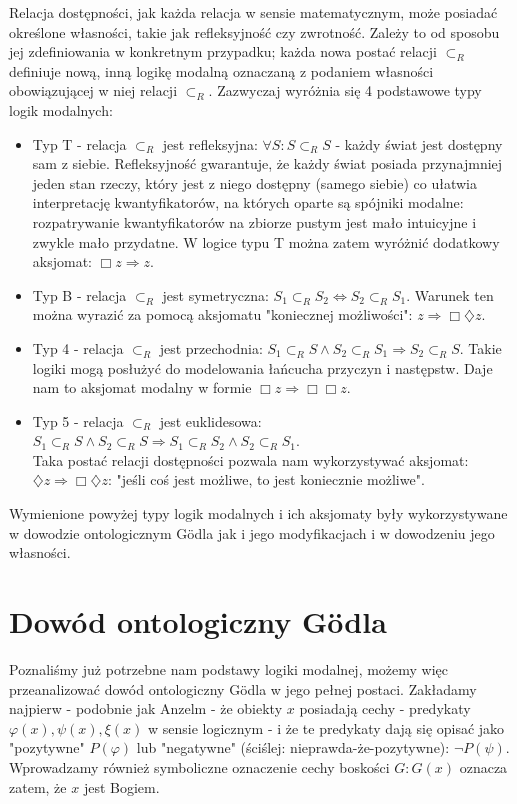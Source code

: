 \documentclass{article}
\begin{document}
Relacja dostępności, jak każda relacja w sensie matematycznym, może posiadać określone własności, takie jak refleksyjność czy zwrotność. Zależy to od sposobu jej zdefiniowania w konkretnym przypadku; każda nowa postać relacji $\subset_R$ definiuje nową, inną logikę modalną oznaczaną z podaniem własności obowiązującej w niej relacji $\subset_R$. Zazwyczaj wyróżnia się 4 podstawowe typy logik modalnych:
\begin{itemize}
	\item Typ T - relacja $\subset_R$ jest refleksyjna: $\forall S: S \subset_R S$ - każdy świat jest dostępny sam z siebie. Refleksyjność gwarantuje, że każdy świat posiada przynajmniej jeden stan rzeczy, który jest z niego dostępny (samego siebie) co ułatwia interpretację kwantyfikatorów, na których oparte są spójniki modalne: rozpatrywanie kwantyfikatorów na zbiorze pustym jest mało intuicyjne i zwykle mało przydatne. W logice typu T można zatem wyróżnić dodatkowy aksjomat: $\Box z \Rightarrow z$. 
	\item Typ B - relacja $\subset_R$ jest symetryczna: $S_1 \subset_R S_2 \Leftrightarrow S_2 \subset_R S_1$. Warunek ten można wyrazić za pomocą aksjomatu "koniecznej możliwości": $z \Rightarrow \Box \diamondsuit z$. 
	\item Typ 4 - relacja $\subset_R$ jest przechodnia: $S_1 \subset_R S \wedge S_2 \subset_R S_1 \Rightarrow S_2 \subset_R S$. Takie logiki mogą posłużyć do modelowania łańcucha przyczyn i następstw. Daje nam to aksjomat modalny w formie $\Box z \Rightarrow \Box \Box z$. 
	\item Typ 5 - relacja $\subset_R$ jest euklidesowa: \\ $S_1 \subset_R S \wedge S_2 \subset_R S \Rightarrow S_1 \subset_R S_2 \wedge S_2 \subset_R S_1$. \\
	Taka postać relacji dostępności pozwala nam wykorzystywać aksjomat: $\diamondsuit z \Rightarrow \Box \diamondsuit z$: "jeśli coś jest możliwe, to jest koniecznie możliwe". 
\end{itemize}
Wymienione powyżej typy logik modalnych i ich aksjomaty były wykorzystywane w dowodzie ontologicznym Gödla jak i jego modyfikacjach i w dowodzeniu jego własności. 

\section{Dowód ontologiczny Gödla} \label{sec:godel-proof}

Poznaliśmy już potrzebne nam podstawy logiki modalnej, możemy więc przeanalizować dowód ontologiczny Gödla w jego pełnej postaci. Zakładamy najpierw - podobnie jak Anzelm - że obiekty $x$ posiadają cechy - predykaty $\varphi(x), \psi(x), \xi(x)$ w sensie logicznym - i że te predykaty dają się opisać jako "pozytywne" $P(\varphi)$ lub "negatywne" (ściślej: nieprawda-że-pozytywne): $\neg P(\psi)$. Wprowadzamy również symboliczne oznaczenie cechy boskości $G: G(x)$ oznacza zatem, że $x$ jest Bogiem. 
\end{document}
